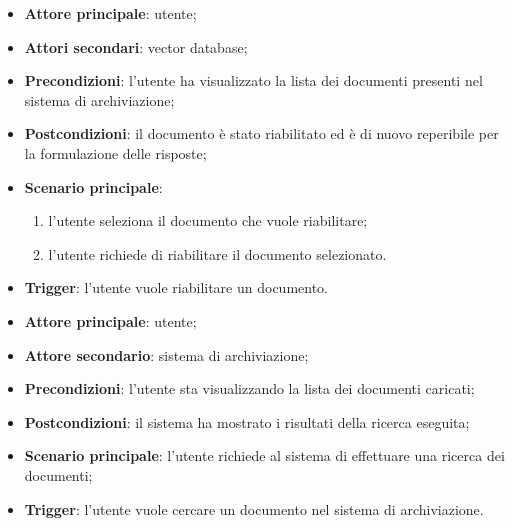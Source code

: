 \documentclass[10pt, a4paper]{article}
\begin{document}
    \begin{itemize}
        \item \textbf{Attore principale}: utente;
        \item \textbf{Attori secondari}: vector database;
        \item \textbf{Precondizioni}: l’utente ha visualizzato la lista dei documenti presenti nel sistema di archiviazione;
        \item \textbf{Postcondizioni}: il documento è stato riabilitato ed è di nuovo reperibile per la formulazione delle risposte;
        \item \textbf{Scenario principale}:
            \begin{enumerate}
                \item l’utente seleziona il documento che vuole riabilitare;
                \item l’utente richiede di riabilitare il documento selezionato.
            \end{enumerate}
        \item \textbf{Trigger}: l’utente vuole riabilitare un documento.
    \end{itemize}

    \begin{itemize}
        \item \textbf{Attore principale}: utente;
        \item \textbf{Attore secondario}: sistema di archiviazione;
        \item \textbf{Precondizioni}: l’utente sta visualizzando la lista dei documenti caricati;
        \item \textbf{Postcondizioni}: il sistema ha mostrato i risultati della ricerca eseguita;
        \item \textbf{Scenario principale}: l’utente richiede al sistema di effettuare una ricerca dei documenti;
        \item \textbf{Trigger}: l’utente vuole cercare un documento nel sistema di archiviazione.
    \end{itemize}
    
\end{document}
